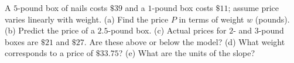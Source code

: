 A $5$-pound box of nails costs $\$39$ and a $1$-pound box costs $\$11$; assume price varies linearly with weight. (a) Find the price $P$ in terms of weight $w$ (pounds). (b) Predict the price of a $2.5$-pound box. (c) Actual prices for $2$- and $3$-pound boxes are $\$21$ and $\$27$. Are these above or below the model? (d) What weight corresponds to a price of $\$33.75$? (e) What are the units of the slope?
